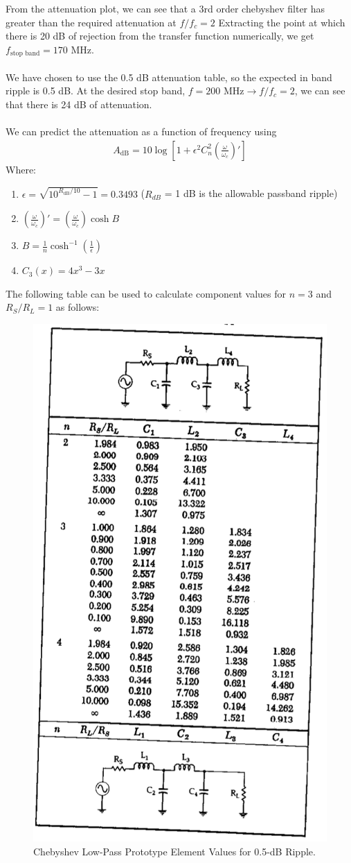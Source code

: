 \documentclass[letterpaper,12pt]{article}
\begin{document}
\noindent
From the attenuation plot, we can see that a 3rd order chebyshev filter has greater than the required attenuation at $f/f_c=2$
Extracting the point at which there is 20 dB of rejection from the transfer function numerically, we get $f_\text{stop band}=170 \text{ MHz}$. \\
\\
We have chosen to use the 0.5 dB attenuation table, so the expected in band ripple is 0.5 dB.
At the desired stop band, $f = 200 \text{ MHz} \to f/f_c=2$, we can see that there is 24 dB of attenuation.\\
\\
We can predict the attenuation as a function of frequency using
\begin{align*}
    A_\text{dB}=10\log\left[1+\epsilon^2C_n^2\left(\frac{\omega}{\omega_c}\right)'\right]
\end{align*}
Where:
\begin{enumerate}
  \item $\epsilon=\sqrt{10^{R_\text{dB}/10}-1} = 0.3493$ ($R_{dB}$ = 1 dB is the allowable passband ripple)
  \item $\left(\frac{\omega}{\omega_c}\right)' = \left(\frac{\omega}{\omega_c}\right) \cosh B$
  \item $B=\frac{1}{n}\cosh^{-1}\left(\frac{1}{\epsilon}\right)$
  \item $C_3(x)=4x^3-3x$
\end{enumerate}
The following table can be used to calculate component values for $n=3$ and $R_S/R_L = 1$ as follows:
\begin{figure}[H] 
    \centering \includegraphics[width=0.3\columnwidth]{figures/3.filter_table}
    \caption{
            \label{fig:2.filter_table}
            Chebyshev Low-Pass Prototype Element Values for 0.5-dB Ripple.
    }
\end{figure}
\end{document}
